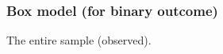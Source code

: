 \documentclass[handout]{beamer}
\begin{document}


   \begin{frame}
   \frametitle{Box model (for binary outcome)}
   \begin{center}
   \end{center}
   The entire sample (observed).
   \end{frame}

\end{document}
